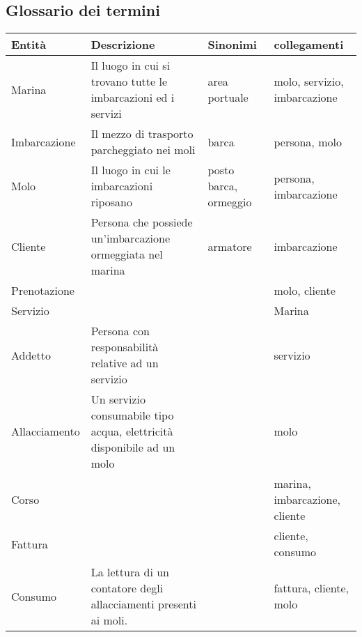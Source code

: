  

\subsection{Glossario dei termini}

\begin{center}
    \begin{tabularx}{\textwidth}{|p{2.4cm}|p{8cm}|p{2.4cm}|X|}
        \hline
        \textbf{Entità} & \textbf{Descrizione} & \textbf{Sinonimi} & \textbf{collegamenti} \\
        \hline
        Marina & Il luogo in cui si trovano tutte le imbarcazioni ed i servizi  & area portuale & molo, servizio, imbarcazione\\
        
        \hline
        Imbarcazione & Il mezzo di trasporto parcheggiato nei moli & barca & persona, molo\\
        
        \hline
        Molo & Il luogo in cui le imbarcazioni riposano & posto barca, ormeggio & persona, imbarcazione\\
        
        \hline
        Cliente& Persona che possiede un'imbarcazione ormeggiata nel marina & armatore & imbarcazione\\
        
        \hline
        Prenotazione &&&molo, cliente \\
        
        \hline
        Servizio &&&Marina \\
        
        \hline
        Addetto & Persona con responsabilità relative ad un servizio & & servizio \\
        
        \hline
        Allacciamento & Un servizio consumabile tipo acqua, elettricità disponibile ad un molo& & molo\\
        \hline
        Corso & & &marina, imbarcazione, cliente\\
        \hline
        Fattura &&& cliente, consumo\\
        \hline
        Consumo & La lettura di un contatore degli allacciamenti presenti ai moli.& & fattura, cliente, molo\\
        \hline
    \end{tabularx}
\end{center}

